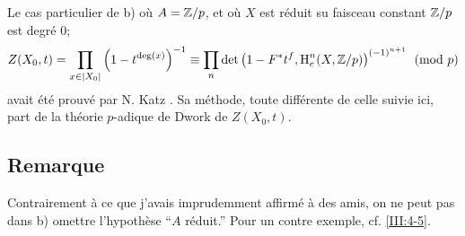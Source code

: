 Le cas particulier de b) o\`u $A=\mathbb{Z}/p$, et o\`u $X$ est r\'eduit su faisceau 
constant $\mathbb{Z}/p$ est degr\'e $0$;
\[
  Z(X_0,t) = \prod_{x\in |X_0|} \left(1-t^{\deg(x)}\right)^{-1}
      \equiv \prod_n \det\left(1-F^* t^f,\operatorname{H}_c^n(X,\mathbb{Z}/p)\right)^{(-1)^{n+1}} \pmod p
\]
avait \'et\'e prouv\'e par N. Katz \cite[XXII 3.1]{sga7}. Sa m\'ethode, toute 
diff\'erente de celle suivie ici, part de la th\'eorie $p$-adique de Dwork de 
$Z(X_0,t)$. 





\subsection{Remarque}


Contrairement \`a ce que j'avais imprudemment affirm\'e \`a des amis, on ne 
peut pas dans b) omettre l'hypoth\`ese ``$A$ r\'eduit.'' Pour un contre 
exemple, cf. \ref{III:4-5}. 


